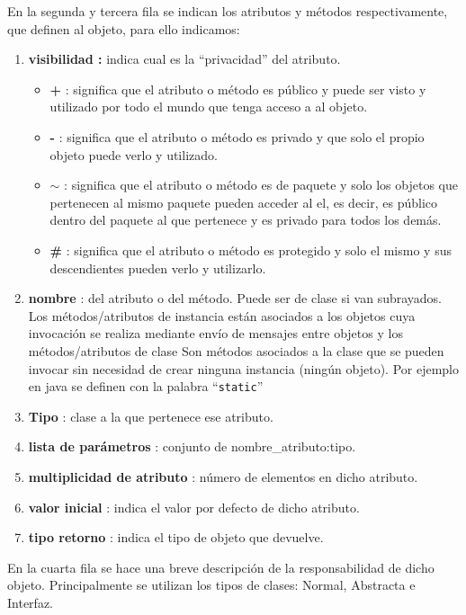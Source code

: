 \documentclass[10pt,a4paper,titlepage]{article}
\begin{document}
En la segunda y tercera fila se indican los atributos y métodos respectivamente,  que definen al objeto, para ello indicamos:
\begin{enumerate}
\item \textbf{visibilidad :} indica cual es la ``privacidad'' del atributo.
	\begin{itemize}
	\item \textbf{+} : significa que el atributo o método es público y puede ser visto y utilizado por todo el mundo que tenga acceso a al objeto.
	\item \textbf{-} : significa que el atributo o método es privado y que solo el propio objeto puede verlo y utilizado.
	\item \textbf{$\sim$} : significa que el atributo o método es de paquete y solo los objetos que pertenecen al mismo paquete pueden acceder al el, es decir, es público dentro del paquete al que pertenece y es privado para todos los demás.
	\item \textbf{\#} : significa que el atributo o método es protegido y solo el mismo y sus descendientes pueden verlo y utilizarlo.
	\end{itemize}

\item \textbf{nombre} : del atributo o del método. Puede ser de clase si van subrayados. Los métodos/atributos de instancia están asociados a los objetos cuya invocación se realiza mediante envío de mensajes entre objetos y los métodos/atributos de clase Son métodos asociados a la clase que se pueden invocar sin necesidad de crear ninguna instancia (ningún objeto). Por ejemplo en java se definen con la palabra ``\texttt{static}''

\item \textbf{Tipo} : clase a la que pertenece ese atributo.
\item \textbf{lista de parámetros} : conjunto de nombre\_atributo:tipo.
\item \textbf{multiplicidad de atributo} : número de elementos en dicho atributo.
\item \textbf{valor inicial} : indica el valor por defecto de dicho atributo.
\item \textbf{tipo retorno} : indica el tipo de objeto que devuelve.

\end{enumerate}
En la cuarta fila se hace una breve descripción de la responsabilidad de dicho objeto.
Principalmente se utilizan los tipos de clases: Normal, Abstracta e Interfaz.\\
\end{document}
